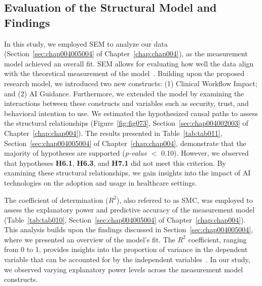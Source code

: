 \subsection{Evaluation of the Structural Model and Findings}
\label{chap:app002004004}

In this study, we employed \ac{SEM} to analyze our data (Section~\ref{sec:chap004005004} of Chapter~\ref{chap:chap004}), as the measurement model achieved an overall fit.
\ac{SEM} allows for evaluating how well the data align with the theoretical measurement of the model~\cite{doi:10.1080/10705511.2017.1401932}.
Building upon the proposed research model, we introduced two new constructs:
(1) Clinical Workflow Impact; and
(2) \ac{AI} Guidance.
Furthermore, we extended the model by examining the interactions between these constructs and variables such as security, trust, and behavioral intention to use.
We estimated the hypothesized causal paths to assess the structural relationships \textcolor{revised}{(Figure~\ref{fig:fig073}, Section~\ref{sec:chap004002003} of Chapter~\ref{chap:chap004})}.
The results presented in \textcolor{revised}{Table~\ref{tab:tab011}, Section~\ref{sec:chap004005004} of Chapter~\ref{chap:chap004}}, demonstrate that the majority of hypotheses are supported ({\it p-value} $<$ 0.10).
However, we observed that hypotheses {\bf H6.1}, {\bf H6.3}, and {\bf H7.1} did not meet this criterion.
By examining these structural relationships, we gain insights into the impact of \ac{AI} technologies on the adoption and usage in healthcare settings.

The coefficient of determination ($R^2$), also referred to as \ac{SMC}, was employed to assess the explanatory power and predictive accuracy of the measurement model \textcolor{revised}{(Table~\ref{tab:tab010}, Section~\ref{sec:chap004005004} of Chapter~\ref{chap:chap004})}.
This analysis builds upon the findings discussed in Section~\ref{sec:chap004005004}, where we presented an overview of the model's fit.
The $R^2$ coefficient, ranging from 0 to 1, provides insights into the proportion of variance in the dependent variable that can be accounted for by the independent variables~\cite{doi:10.1080/10705511.2017.1401932}.
In our study, we observed varying explanatory power levels across the measurement model constructs.

